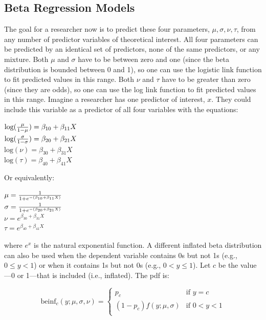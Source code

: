 \documentclass[english,man]{apa6}
\theoremstyle{definition}
\theoremstyle{definition}
\theoremstyle{remark}
\begin{document}
\subsection{Beta Regression Models}\label{beta-regression-models}

The goal for a researcher now is to predict these four parameters,
\(\mu, \sigma, \nu, \tau\), from any number of predictor variables of
theoretical interest. All four parameters can be predicted by an
identical set of predictors, none of the same predictors, or any
mixture. Both \(\mu\) and \(\sigma\) have to be between zero and one
(since the beta distribution is bounded between 0 and 1), so one can use
the logistic link function to fit predicted values in this range. Both
\(\nu\) and \(\tau\) have to be greater than zero (since they are odds),
so one can use the log link function to fit predicted values in this
range. Imagine a researcher has one predictor of interest, \(x\). They
could include this variable as a predictor of all four variables with
the equations:

\begin{center}
$\text{log}({\mu \over 1 - \mu}) = \beta_{10} + \beta_{11}X$\\
$\text{log}({\sigma \over 1 - \sigma}) = \beta_{20} + \beta_{21}X$\\
$\text{log}(\nu) = \beta_{30} + \beta_{31}X$\\
$\text{log}(\tau) = \beta_{40} + \beta_{41}X$
\end{center}

Or equivalently:

\begin{center}
$\mu={1\over1+e^{-(\beta_{10}+\beta_{11}X)}}$\\
$\sigma={1\over1+e^{-(\beta_{20}+\beta_{21}X)}}$\\
$\nu = e^{\beta_{30} + \beta_{31}X}$\\
$\tau = e^{\beta_{40} + \beta_{41}X}$
\end{center}

where \(e^x\) is the natural exponential function. A different inflated
beta distribution can also be used when the dependent variable contains
0s but not 1s (e.g., \(0 \leq y < 1\)) or when it contains 1s but not 0s
(e.g., \(0 < y \leq 1\)). Let \(c\) be the value---0 or 1---that is
included (i.e., inflated). The pdf is:

\begin{center}
\[
\text{beinf}_c(y;\mu,\sigma,\nu) =
\begin{cases}
  p_c                             & \text{if } y = c\\
  (1 - p_c)f(y;\mu,\sigma)        & \text{if } 0 < y < 1\\
\end{cases}
\]
\end{center}
\end{document}
